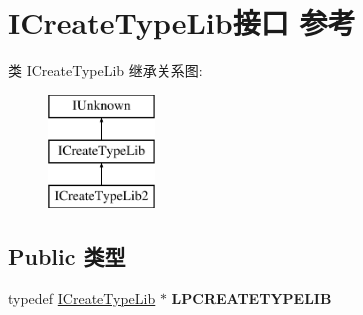 \hypertarget{interface_i_create_type_lib}{}\section{I\+Create\+Type\+Lib接口 参考}
\label{interface_i_create_type_lib}
类 I\+Create\+Type\+Lib 继承关系图\+:\begin{figure}[H]
\begin{center}
\leavevmode
\includegraphics[height=3.000000cm]{interface_i_create_type_lib}
\end{center}
\end{figure}
\subsection*{Public 类型}
\begin{DoxyCompactItemize}
\item 
\mbox{\label{interface_i_create_type_lib_a205e32d6a7febd6308f6143ea0df8248}} 
typedef \hyperlink{interface_i_create_type_lib}{I\+Create\+Type\+Lib} $\ast$ {\bfseries L\+P\+C\+R\+E\+A\+T\+E\+T\+Y\+P\+E\+L\+IB}
\end{DoxyCompactItemize}
